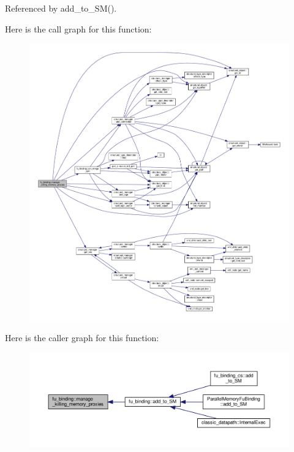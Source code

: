 Referenced by add\+\_\+to\+\_\+\+S\+M().

Here is the call graph for this function\+:
\nopagebreak
\begin{figure}[H]
\begin{center}
\leavevmode
\includegraphics[width=350pt]{d8/d04/classfu__binding_aec6b4a61983de5cd4ccb62fa937a67c4_cgraph}
\end{center}
\end{figure}
Here is the caller graph for this function\+:
\nopagebreak
\begin{figure}[H]
\begin{center}
\leavevmode
\includegraphics[width=350pt]{d8/d04/classfu__binding_aec6b4a61983de5cd4ccb62fa937a67c4_icgraph}
\end{center}
\end{figure}
\mbox{\label{classfu__binding_a29c11d53e1beb8a97c8968a67a935d8b}} 
